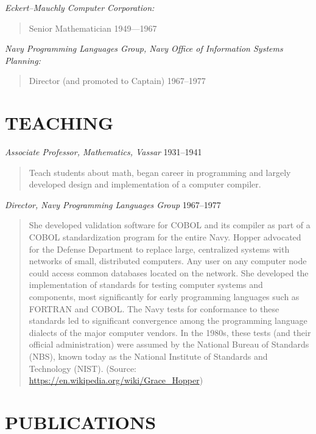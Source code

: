 \documentclass[10pt,]{article}
\begin{document}
\emph{Eckert--Mauchly Computer Corporation:}

\begin{quote}
Senior Mathematician \hfill 1949---1967
\end{quote}

\emph{Navy Programming Languages Group, Navy Office of Information
Systems Planning:}

\begin{quote}
Director (and promoted to Captain) \hfill 1967--1977
\end{quote}

\hypertarget{teaching}{%
\section{TEACHING}\label{teaching}}

\emph{Associate Professor, Mathematics, Vassar} \hfill 1931--1941

\begin{quote}
Teach students about math, began career in programming and largely
developed design and implementation of a computer compiler.
\end{quote}

\emph{Director, Navy Programming Languages Group} \hfill 1967--1977

\begin{quote}
She developed validation software for COBOL and its compiler as part of
a COBOL standardization program for the entire Navy. Hopper advocated
for the Defense Department to replace large, centralized systems with
networks of small, distributed computers. Any user on any computer node
could access common databases located on the network. She developed the
implementation of standards for testing computer systems and components,
most significantly for early programming languages such as FORTRAN and
COBOL. The Navy tests for conformance to these standards led to
significant convergence among the programming language dialects of the
major computer vendors. In the 1980s, these tests (and their official
administration) were assumed by the National Bureau of Standards (NBS),
known today as the National Institute of Standards and Technology
(NIST). (Source: \url{https://en.wikipedia.org/wiki/Grace_Hopper})
\end{quote}

\hypertarget{publications}{%
\section{PUBLICATIONS}\label{publications}}
\end{document}
